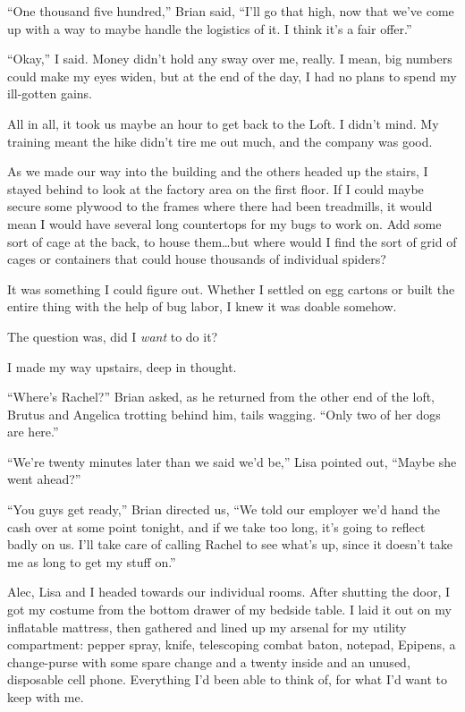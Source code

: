 ``One thousand five hundred,'' Brian said, ``I'll go that high, now that we've come up with a way to maybe handle the logistics of it.  I think it's a fair offer.''



``Okay,'' I said.  Money didn't hold any sway over me, really.  I mean, big numbers could make my eyes widen, but at the end of the day, I had no plans to spend my ill-gotten gains.



All in all, it took us maybe an hour to get back to the Loft.  I didn't mind.  My training meant the hike didn't tire me out much, and the company was good.



As we made our way into the building and the others headed up the stairs, I stayed behind to look at the factory area on the first floor.  If I could maybe secure some plywood to the frames where there had been treadmills, it would mean I would have several long countertops for my bugs to work on.  Add some sort of cage at the back, to house them\ldots but where would I find the sort of grid of cages or containers that could house thousands of individual spiders?



It was something I could figure out.  Whether I settled on egg cartons or built the entire thing with the help of bug labor, I knew it was doable somehow.



The question was, did I \emph{want} to do it?



I made my way upstairs, deep in thought.



``Where's Rachel?'' Brian asked, as he returned from the other end of the loft, Brutus and Angelica trotting behind him, tails wagging. ``Only two of her dogs are here.''



``We're twenty minutes later than we said we'd be,'' Lisa pointed out, ``Maybe she went ahead?''



``You guys get ready,'' Brian directed us, ``We told our employer we'd hand the cash over at some point tonight, and if we take too long, it's going to reflect badly on us.  I'll take care of calling Rachel to see what's up, since it doesn't take me as long to get my stuff on.''



Alec, Lisa and I headed towards our individual rooms.  After shutting the door, I got my costume from the bottom drawer of my bedside table.  I laid it out on my inflatable mattress, then gathered and lined up my arsenal for my utility compartment: pepper spray, knife, telescoping combat baton, notepad, Epipens, a change-purse with some spare change and a twenty inside and an unused, disposable cell phone.  Everything I'd been able to think of, for what I'd want to keep with me.



